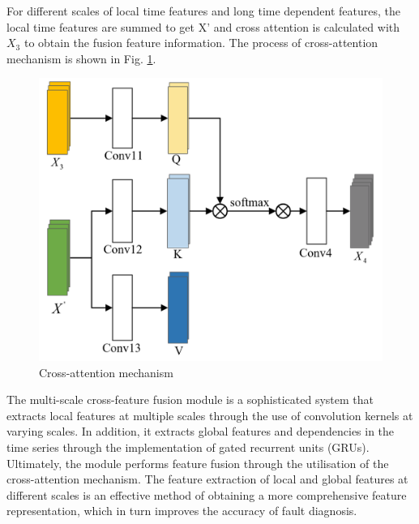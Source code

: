 \documentclass[journal,article,submit,pdftex,moreauthors]{Definitions/mdpi}
\begin{document}
For different scales of local time features and long time dependent features, the local time features are summed to get X' and cross attention is calculated with \({{X}_{3}}\) to obtain the fusion feature information. The process of cross-attention mechanism is shown in Fig. \ref{fig:Cross-attention mechanism}.

\begin{figure}[H]
    \centering
    \includegraphics[width=0.75\linewidth]{图片/交叉注意力机制.png}
    \caption{Cross-attention mechanism}
    \label{fig:Cross-attention mechanism}
\end{figure}
The multi-scale cross-feature fusion module is a sophisticated system that extracts local features at multiple scales through the use of convolution kernels at varying scales. In addition, it extracts global features and dependencies in the time series through the implementation of gated recurrent units (GRUs). Ultimately, the module performs feature fusion through the utilisation of the cross-attention mechanism. The feature extraction of local and global features at different scales is an effective method of obtaining a more comprehensive feature representation, which in turn improves the accuracy of fault diagnosis.
\end{document}
